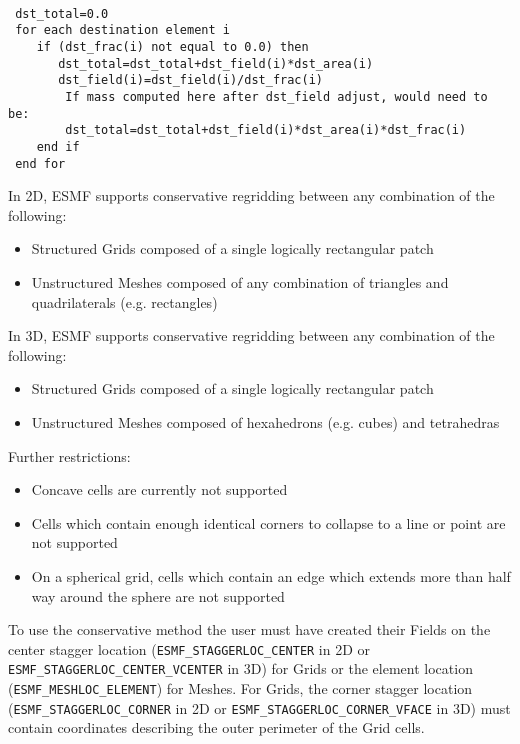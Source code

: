 \begin{verbatim}

 dst_total=0.0
 for each destination element i
    if (dst_frac(i) not equal to 0.0) then
       dst_total=dst_total+dst_field(i)*dst_area(i) 
       dst_field(i)=dst_field(i)/dst_frac(i)
        If mass computed here after dst_field adjust, would need to be:
        dst_total=dst_total+dst_field(i)*dst_area(i)*dst_frac(i) 
    end if
 end for
\end{verbatim}

\smallskip

 In 2D, ESMF supports conservative regridding between any combination of the following:
 \begin{itemize}
 \item Structured Grids composed of a single logically rectangular patch
 \item Unstructured Meshes composed of any combination of triangles and quadrilaterals (e.g. rectangles)
 \end{itemize}

\smallskip

 In 3D, ESMF supports conservative regridding between any combination of the following:
 \begin{itemize}
 \item Structured Grids composed of a single logically rectangular patch
 \item Unstructured Meshes composed of hexahedrons (e.g. cubes) and tetrahedras
 \end{itemize}

\smallskip

Further restrictions:
 \begin{itemize}
 \item Concave cells are currently not supported
 \item Cells which contain enough identical corners to collapse to a line or point are not supported
 \item On a spherical grid, cells which contain an edge which extends more than half way around the sphere are not supported 
 \end{itemize}

 To use the conservative method the user must have created their Fields on the center 
 stagger location ({\tt ESMF\_STAGGERLOC\_CENTER} in 2D or {\tt ESMF\_STAGGERLOC\_CENTER\_VCENTER} in 3D) for Grids  or the element location ({\tt ESMF\_MESHLOC\_ELEMENT}) for Meshes.
 For Grids, the corner stagger location ({\tt ESMF\_STAGGERLOC\_CORNER} in 2D or {\tt ESMF\_STAGGERLOC\_CORNER\_VFACE} in 3D) must contain coordinates describing the outer perimeter of the Grid cells. 

